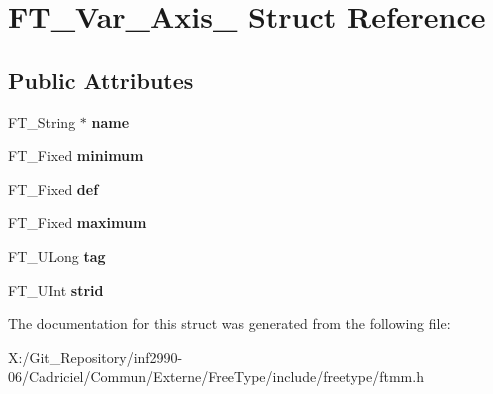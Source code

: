 \hypertarget{struct_f_t___var___axis__}{\section{F\-T\-\_\-\-Var\-\_\-\-Axis\-\_\- Struct Reference}
\label{struct_f_t___var___axis__}
}
\subsection*{Public Attributes}
\begin{DoxyCompactItemize}
\item 
\hypertarget{struct_f_t___var___axis___a8d0e0af322a692999ec3733a3e18a5a4}{F\-T\-\_\-\-String $\ast$ {\bfseries name}}\label{struct_f_t___var___axis___a8d0e0af322a692999ec3733a3e18a5a4}

\item 
\hypertarget{struct_f_t___var___axis___aae13a8dea1c96bc3949019e8117e7edb}{F\-T\-\_\-\-Fixed {\bfseries minimum}}\label{struct_f_t___var___axis___aae13a8dea1c96bc3949019e8117e7edb}

\item 
\hypertarget{struct_f_t___var___axis___a37a6ca4188a6bfd95d9d06538bf1a3dd}{F\-T\-\_\-\-Fixed {\bfseries def}}\label{struct_f_t___var___axis___a37a6ca4188a6bfd95d9d06538bf1a3dd}

\item 
\hypertarget{struct_f_t___var___axis___a5704641439e9f318cf3c2b73864e3260}{F\-T\-\_\-\-Fixed {\bfseries maximum}}\label{struct_f_t___var___axis___a5704641439e9f318cf3c2b73864e3260}

\item 
\hypertarget{struct_f_t___var___axis___a01ef9396e34e740c2d2b8c7117094624}{F\-T\-\_\-\-U\-Long {\bfseries tag}}\label{struct_f_t___var___axis___a01ef9396e34e740c2d2b8c7117094624}

\item 
\hypertarget{struct_f_t___var___axis___a297d28ab0f5666e56d7575249ccc75d7}{F\-T\-\_\-\-U\-Int {\bfseries strid}}\label{struct_f_t___var___axis___a297d28ab0f5666e56d7575249ccc75d7}

\end{DoxyCompactItemize}


The documentation for this struct was generated from the following file\-:\begin{DoxyCompactItemize}
\item 
X\-:/\-Git\-\_\-\-Repository/inf2990-\/06/\-Cadriciel/\-Commun/\-Externe/\-Free\-Type/include/freetype/ftmm.\-h\end{DoxyCompactItemize}
